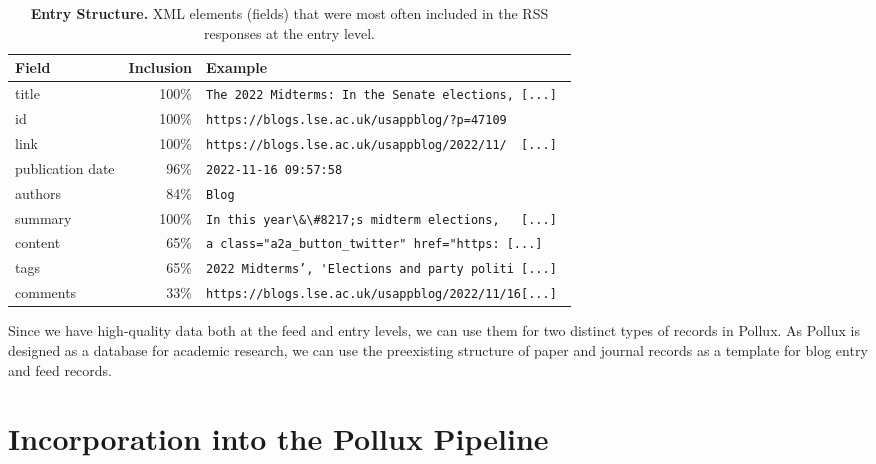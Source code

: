 \documentclass{article}
\begin{document}
\begin{table}[htb]
    \caption{\textbf{Entry Structure.} XML elements (fields) that were most often included in the RSS responses at the entry level.}
    \centering
    \begin{tabular}{lrl}
        \toprule
        \cmidrule(r){1-2}
        \textbf{Field}   & \textbf{Inclusion} & \textbf{Example}                                          \\
        \midrule
        title            & 100\%             & \verb|The 2022 Midterms: In the Senate elections, [...] | \\
        id               & 100\%             & \verb|https://blogs.lse.ac.uk/usappblog/?p=47109        | \\
        link             & 100\%             & \verb|https://blogs.lse.ac.uk/usappblog/2022/11/  [...] | \\
        publication date & 96\%              & \verb|2022-11-16 09:57:58|                                \\
        authors          & 84\%              & \verb|Blog|                                               \\
        summary          & 100\%             & \verb|In this year\&\#8217;s midterm elections,   [...] | \\
        content          & 65\%              & \verb|a class="a2a_button_twitter" href="https: [...] | \\
        tags             & 65\%              & \verb|2022 Midterms’, 'Elections and party politi [...] | \\
        comments         & 33\%              & \verb|https://blogs.lse.ac.uk/usappblog/2022/11/16[...] | \\
        \bottomrule
    \end{tabular}
    \label{tab:entry_structure}
\end{table}

Since we have high-quality data both at the feed and entry levels, we can use them for two distinct types of records in Pollux. As Pollux is designed as a database for academic research, we can use the preexisting structure of paper and journal records as a template for blog entry and feed records.


\section{Incorporation into the Pollux Pipeline}\label{sec:incorporation}
\end{document}
